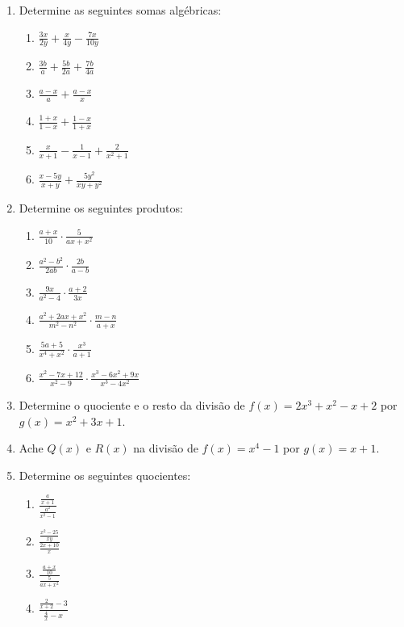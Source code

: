 \documentclass[oneside,a4paper,12pt]{article}
\begin{document}
\begin{enumerate}
	\item Determine as seguintes somas algébricas:
	\begin{multicols}{2}
	\begin{enumerate}
		\item $\frac{3x}{2y} + \frac{x}{4y} - \frac{7x}{10y} $
		\item $ \frac{3b}{a} + \frac{5b}{2a} + \frac{7b}{4a}$
		\item $ \frac{a-x}{a}+ \frac{a - x}{x}$
		\item $ \frac{1+x}{1-x} + \frac{1-x}{1+x} $
		\item $ \frac{x}{x+1} - \frac{1}{x-1} + \frac{2}{x^{2}+1}$
		\item $ \frac{x-5y}{x+y} + \frac{5y^{2}}{xy+y^{2}}$
	\end{enumerate}
	\end{multicols}

	\item Determine os seguintes produtos:
	\begin{multicols}{2}
	\begin{enumerate}
		\item $\frac{a+x}{10} \cdot \frac{5}{ax+x^{2}}$
		\item $\frac{a^{2} - b^{2}}{2ab} \cdot \frac{2b}{a-b}$
		\item $\frac{9x}{a^{2} -4} \cdot \frac{a+2}{3x}$
		\item $\frac{a^{2} + 2ax + x^{2}}{m^{2} - n^{2}} \cdot \frac{m-n}{a+x}$
		\item $\frac{5a + 5}{x^{4} + x^{2}} \cdot \frac{x^{3}}{a+1}$
		\item $\frac{x^{2} - 7x + 12}{x^{2} -9} \cdot \frac{x^{3} - 6x^{2} + 9x}{x^{3} - 4x^{2}} $
	\end{enumerate}
	\end{multicols}

	\item Determine o quociente e o resto da divisão de $f(x) = 2x^{3} + x^{2} - x + 2$ por $g(x) = x^{2} + 3x + 1$.
	
	\item Ache $Q(x)$ e $R(x)$ na divisão de $f(x) = x^{4} - 1$ por $g(x) = x + 1$.
	
	\item Determine os seguintes quocientes:
	\begin{multicols}{2}
	\begin{enumerate}
		\item $ \frac{ \frac{a}{x+1}}{ \frac{a^{2}}{x^{2} -1}}$
		\item $ \frac{ \frac{x^{2}-25}{xy}}{ \frac{2x + 10}{x} }$
		\item $ \frac{ \frac{a+x}{10}}{ \frac{5}{ax+x^{2}}}$
		\item $ \frac{ \frac{2}{x+2} - 3}{ \frac{4}{x} - x}$
	\end{enumerate}
	\end{multicols}


\end{enumerate}
\end{document}
